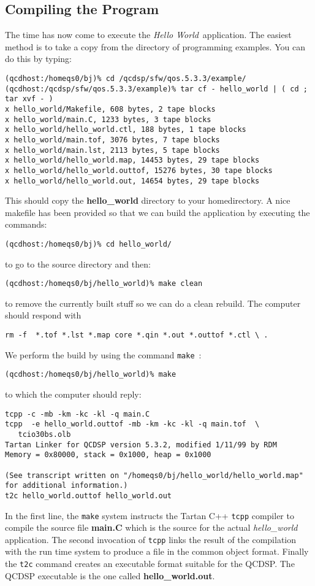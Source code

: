 \subsection{Compiling the Program}
The time has now come to execute the {\em Hello World}\ application.
The easiest method is to take a copy from the directory of programming
examples. You can do this by typing:
\begin{verbatim}
(qcdhost:/homeqs0/bj)% cd /qcdsp/sfw/qos.5.3.3/example/
(qcdhost:/qcdsp/sfw/qos.5.3.3/example)% tar cf - hello_world | ( cd ; tar xvf - )
x hello_world/Makefile, 608 bytes, 2 tape blocks
x hello_world/main.C, 1233 bytes, 3 tape blocks
x hello_world/hello_world.ctl, 188 bytes, 1 tape blocks
x hello_world/main.tof, 3076 bytes, 7 tape blocks
x hello_world/main.lst, 2113 bytes, 5 tape blocks
x hello_world/hello_world.map, 14453 bytes, 29 tape blocks
x hello_world/hello_world.outtof, 15276 bytes, 30 tape blocks
x hello_world/hello_world.out, 14654 bytes, 29 tape blocks
\end{verbatim}
This should copy the {\bf hello\_world} directory to your homedirectory.
A nice makefile has been provided so that we can build the application
by executing the commands:
\begin{verbatim}
(qcdhost:/homeqs0/bj)% cd hello_world/
\end{verbatim}
to go to the source directory and then:
\begin{verbatim}
(qcdhost:/homeqs0/bj/hello_world)% make clean
\end{verbatim} 
to remove the currently built stuff so we can do a clean 
rebuild. The computer should respond with 
\begin{verbatim}
rm -f  *.tof *.lst *.map core *.qin *.out *.outtof *.ctl \ .
\end{verbatim}
We perform the build by using the command {\tt make}\ :
\begin{verbatim}
(qcdhost:/homeqs0/bj/hello_world)% make
\end{verbatim}
to which the computer should reply:
\begin{verbatim}
tcpp -c -mb -km -kc -kl -q main.C
tcpp  -e hello_world.outtof -mb -km -kc -kl -q main.tof  \
   tcio30bs.olb 
Tartan Linker for QCDSP version 5.3.2, modified 1/11/99 by RDM
Memory = 0x80000, stack = 0x1000, heap = 0x1000

(See transcript written on "/homeqs0/bj/hello_world/hello_world.map"
for additional information.)
t2c hello_world.outtof hello_world.out
\end{verbatim}
In the first line, the {\tt make} system instructs the
Tartan C++ {\tt tcpp} compiler to compile the source file {\bf main.C}
which is the source for the actual {\em hello\_world} application. The second
invocation of {\tt tcpp} links the result of the compilation with the run time 
system to produce a file in the common object format. Finally the {\tt t2c}
command creates an executable format suitable for the QCDSP. The QCDSP 
executable is the one called {\bf hello\_world.out}.


